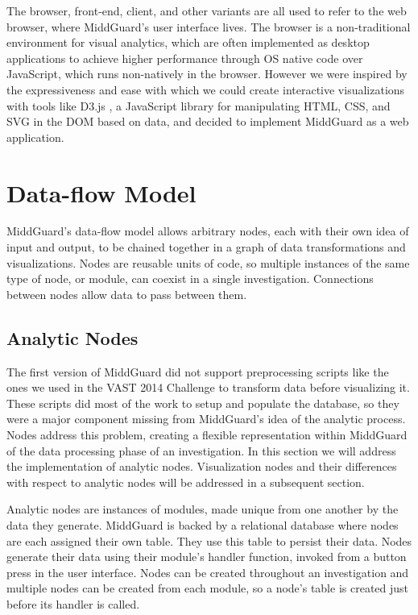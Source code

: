 \documentclass[midd]{thesis}
\begin{document}
The browser, front-end, client, and other variants are all used to refer to the
web browser, where MiddGuard's user interface lives. The browser is a
non-traditional environment for visual analytics, which are often implemented as
desktop applications to achieve higher performance through OS native code over
JavaScript, which runs non-natively in the browser. However we were inspired by
the expressiveness and ease with which we could create interactive
visualizations with tools like D3.js \cite{2011-d3}, a JavaScript library for
manipulating HTML, CSS, and SVG in the DOM based on data, and decided to
implement MiddGuard as a web application.

\section{Data-flow Model}

MiddGuard's data-flow model allows arbitrary nodes, each with their own idea of
input and output, to be chained together in a graph of data transformations and
visualizations. Nodes are reusable units of code, so multiple instances of the
same type of node, or module, can coexist in a single investigation. Connections
between nodes allow data to pass between them.

\subsection{Analytic Nodes}

The first version of MiddGuard did not support preprocessing scripts like the
ones we used in the VAST 2014 Challenge to transform data before visualizing it.
These scripts did most of the work to setup and populate the database, so they
were a major component missing from MiddGuard's idea of the analytic process.
Nodes address this problem, creating a flexible representation within MiddGuard
of the data processing phase of an investigation. In this section we will
address the implementation of analytic nodes. Visualization nodes and their
differences with respect to analytic nodes will be addressed in a subsequent
section.

Analytic nodes are instances of modules, made unique from one another by the
data they generate. MiddGuard is backed by a relational database where nodes are
each assigned their own table. They use this table to persist their data. Nodes
generate their data using their module's handler function, invoked from a button
press in the user interface. Nodes can be created throughout an investigation
and multiple nodes can be created from each module, so a node's table is created
just before its handler is called.
\end{document}
